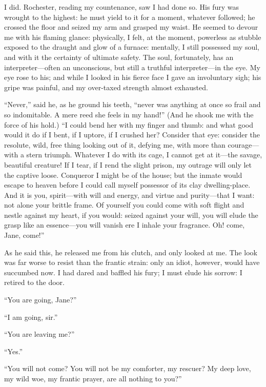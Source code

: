 I did. \Mr{} Rochester, reading my countenance, saw I had done so. His
fury was wrought to the highest: he must yield to it for a moment,
whatever followed; he crossed the floor and seized my arm and grasped my
waist. He seemed to devour me with his flaming glance: physically, I
felt, at the moment, powerless as stubble exposed to the draught and
glow of a furnace: mentally, I still possessed my soul, and with it the
certainty of ultimate safety. The soul, fortunately, has an
interpreter---often an unconscious, but still a truthful
interpreter---in the eye. My eye rose to his; and while I looked in his
fierce face I gave an involuntary sigh; his gripe was painful, and my
over-taxed strength almost exhausted.

\enquote{Never,} said he, as he ground his teeth, \enquote{never was
	anything at once so frail and so indomitable. A mere reed she feels in
	my hand!} (And he shook me with the force of his hold.) \enquote{I
	could bend her with my finger and thumb: and what good would it do if I
	bent, if I uptore, if I crushed her? Consider that eye: consider the
	resolute, wild, free thing looking out of it, defying me, with more than
	courage---with a stern triumph. Whatever I do with its cage, I cannot
	get at it---the savage, beautiful creature! If I tear, if I rend the
	slight prison, my outrage will only let the captive loose. Conqueror I
	might be of the house; but the inmate would escape to heaven before I
	could call myself possessor of its clay dwelling-place. And it is you,
	spirit---with will and energy, and virtue and purity---that I want: not
	alone your brittle frame. Of yourself you could come with soft flight
	and nestle against my heart, if you would: seized against your will, you
	will elude the grasp like an essence---you will vanish ere I inhale your
	fragrance. Oh! come, Jane, come!}

As he said this, he released me from his clutch, and only looked at me.
The look was far worse to resist than the frantic strain: only an idiot,
however, would have succumbed now. I had dared and baffled his fury; I
must elude his sorrow: I retired to the door.

\enquote{You are going, Jane?}

\enquote{I am going, sir.}

\enquote{You are leaving me?}

\enquote{Yes.}

\enquote{You will not come? You will not be my comforter, my rescuer?
	My deep love, my wild woe, my frantic prayer, are all nothing to you?}

